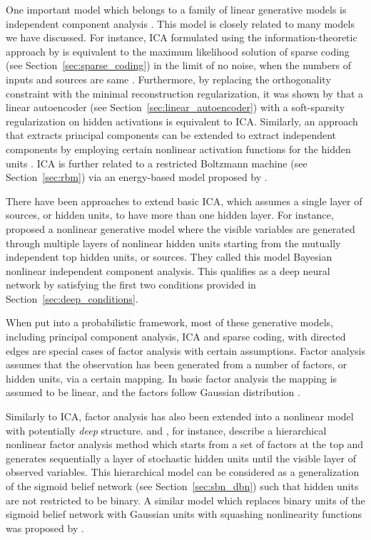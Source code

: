 \documentclass[dissertation,nocontribution,draft*]{aaltoseries}
\begin{document}
One important model which belongs to a family of linear
generative models is independent component analysis
\citep[ICA, see, e.g.,][]{Hyvarinen2001}. This model is closely related to
many models we have discussed.  For instance, ICA formulated
using the information-theoretic approach by \citet{Bell1995}
is equivalent to the maximum likelihood solution of sparse
coding (see Section~\ref{sec:sparse_coding}) in the limit of
no noise, when the numbers of inputs and
sources are same \citep{Olshausen1997}.  Furthermore, by
replacing the orthogonality constraint with the minimal
reconstruction regularization, it was shown by
\citet{Le2011} that a linear autoencoder (see
Section~\ref{sec:linear_autoencoder}) with a
soft-sparsity regularization on hidden activations is
equivalent to ICA. Similarly, an approach that extracts
principal components can be extended to extract independent
components by employing certain nonlinear
activation functions for the hidden units \citep[see,
e.g.,][]{Oja1997,Hyvarinen2001}. ICA is further related
to a restricted Boltzmann machine (see
Section~\ref{sec:rbm}) via an energy-based model proposed by
\citet{Teh2003}.

There have been approaches to extend basic ICA, which
assumes a single layer of sources, or hidden units, to have
more than one hidden layer. For instance,
\citet{Lappalainen2000} proposed a nonlinear generative
model where the visible variables are generated through
multiple layers of nonlinear hidden units starting from the
mutually independent top hidden units, or sources. They
called this model Bayesian nonlinear independent component
analysis. This qualifies as a deep neural network by
satisfying the first two conditions provided in
Section~\ref{sec:deep_conditions}.

When put into a probabilistic framework, most of these
generative models, including principal component analysis,
ICA and sparse coding, with directed edges are special cases
of factor analysis with certain assumptions. Factor analysis
assumes that the observation has been generated from a
number of factors, or hidden units, via a certain mapping.
In basic factor analysis the mapping is
assumed to be linear, and the factors follow Gaussian
distribution \citep[see, e.g.,][Chapter 12.2.4]{Bishop2006}. 

Similarly to ICA, factor analysis has also been extended
into a nonlinear model with potentially \textit{deep}
structure. \citet{Raiko2001} and \citet{Raiko2007}, for instance,
describe a hierarchical nonlinear factor analysis method which
starts from a set of factors at the top and generates
sequentially a layer of stochastic hidden units until the
visible layer of observed variables. This hierarchical model
can be considered as a generalization of the sigmoid belief
network (see Section~\ref{sec:sbn_dbn}) such that hidden
units are not restricted to be binary. A similar model which
replaces binary units of the sigmoid belief network with
Gaussian units with squashing nonlinearity functions 
was proposed by \citet{Frey1999}.
\end{document}
